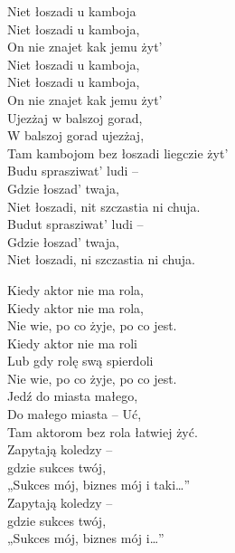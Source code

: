 \begin{text}
    Niet łoszadi u kamboja\\
    Niet łoszadi u kamboja, \\
    On nie znajet kak jemu żyt’ \\
    Niet łoszadi u kamboja,\\
    Niet łoszadi u kamboja,\\
    On nie znajet kak jemu żyt’\\
    Ujezżaj w balszoj gorad,\\ 
    W balszoj gorad ujezżaj,\\
    Tam kambojom bez łoszadi liegczie żyt’ 	\\
    Budu sprasziwat’ ludi –\\
    Gdzie łoszad’ twaja, \\
    Niet łoszadi, nit szczastia ni chuja. \\
    Budut sprasziwat’ ludi –\\
    Gdzie łoszad’ twaja, \\
    Niet łoszadi, ni szczastia ni chuja. 

    Kiedy aktor nie ma rola,\\
    Kiedy aktor nie ma rola,\\
    Nie wie, po co żyje, po co jest.\\
    Kiedy aktor nie ma roli\\
    Lub gdy rolę swą spierdoli \\
    Nie wie, po co żyje, po co jest. \\
    Jedź do miasta małego, \\
    Do małego miasta – Uć, \\
    Tam aktorom bez rola łatwiej żyć.\\ 
    Zapytają koledzy – 	\\
    gdzie sukces twój, \\
    „Sukces mój, biznes mój i taki…”\\ 
    Zapytają koledzy –\\
    gdzie sukces twój, \\
    „Sukces mój, biznes mój i…” 	

\end{text}
